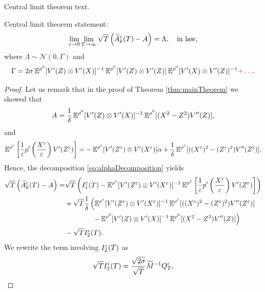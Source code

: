 \documentclass[10pt]{article}
\begin{document}
Central limit theorem text.
\begin{theorem}\label{thm:CLT} Central limit theorem statement:
	\begin{equation}
		\lim_{\varepsilon \to 0}\lim_{T \to \infty} \sqrt{T}\left(\widehat A^\varepsilon_k(T) - A\right) = \Lambda, \quad \text{in law,}
	\end{equation}
	where $\Lambda \sim \mathcal N(0, \Gamma)$ and 
	\begin{equation}
		\Gamma = 2\sigma \operatorname{\mathbb{E}}^{\rho^0}[V'(Z) \otimes V'(X)]^{-1}\operatorname{\mathbb{E}}^{\rho^0}[V'(Z) \otimes V'(Z)]\operatorname{\mathbb{E}}^{\rho^0}[V'(X) \otimes V'(Z)]^{-1} {\color{red}+ \dots}.
	\end{equation}
\end{theorem}

\begin{proof} Let us remark that in the proof of Theorem \ref{thm:mainTheorem} we showed that
	\begin{equation}
	A = \frac1\delta \operatorname{\mathbb{E}}^{\rho^0}[V'(Z) \otimes V'(X)]^{-1} \operatorname{\mathbb{E}}^{\rho^0}[(X^2 - Z^2)V''(Z)],
	\end{equation}
	and
	\begin{equation}
	\operatorname{\mathbb{E}}^{\rho^\varepsilon} \left [ \frac{1}{\varepsilon} p' \left ( \frac{X^\varepsilon}{\varepsilon} \right ) V'(Z^\varepsilon) \right ] = - \operatorname{\mathbb{E}}^{\rho^\varepsilon} [ V'(Z^\varepsilon) \otimes V'(X^\varepsilon) ] \alpha + \frac1\delta \operatorname{\mathbb{E}}^{\rho^\varepsilon}[((X^\varepsilon)^2 - (Z^\varepsilon)^2)V''(Z^\varepsilon)].
	\end{equation}
	Hence, the decomposition \eqref{eq:alphaDecomposition} yields
	\begin{equation}
	\begin{aligned}
	\sqrt{T}\left(\widehat A^\varepsilon_k(T) - A\right) = & \sqrt{T}\left( I_1^\varepsilon(T) - \operatorname{\mathbb{E}}^{\rho^\varepsilon} [ V'(Z^\varepsilon) \otimes V'(X^\varepsilon) ]^{-1} \operatorname{\mathbb{E}}^{\rho^\varepsilon} \left [ \frac{1}{\varepsilon} p' \left ( \frac{X^\varepsilon}{\varepsilon} \right ) V'(Z^\varepsilon) \right ] \right) \\
	&+ \sqrt{T} \frac1\delta \left( \operatorname{\mathbb{E}}^{\rho^\varepsilon} [ V'(Z^\varepsilon) \otimes V'(X^\varepsilon) ]^{-1} \operatorname{\mathbb{E}}^{\rho^\varepsilon}[((X^\varepsilon)^2 - (Z^\varepsilon)^2)V''(Z^\varepsilon)] \right. \\
	&\qquad \qquad \left. - \operatorname{\mathbb{E}}^{\rho^0} [ V'(Z) \otimes V'(X) ]^{-1} \operatorname{\mathbb{E}}^{\rho^0}[(X^2 - Z^2)V''(Z)] \right) \\
	&- \sqrt{T} I_2^\varepsilon(T).
	\end{aligned}
	\end{equation}
	 We rewrite the term involving $I_2^\varepsilon(T)$ as
	\begin{equation}
	\sqrt{T} I_2^\varepsilon(T) = \frac{\sqrt{2\sigma}}{\sqrt{T}} \widetilde M^{-1} Q^\varepsilon_T,
	\end{equation}

\end{proof}
\end{document}
